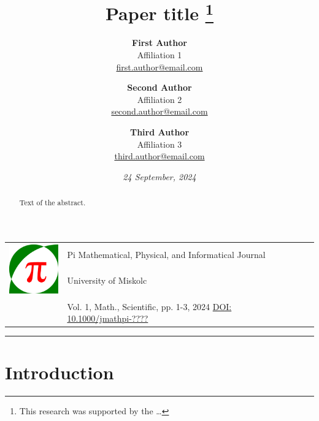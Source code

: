 \documentclass[a4paper,12pt]{article}
\begin{document}
\pagestyle{fancy}

\title{\sc Paper title \thanks{This research was supported by the \dots}}

\author{
	\textbf{First Author} \\
	Affiliation 1 \\
	\href{mailto:first.author@email.com}{first.author@email.com}
\and
	\textbf{Second Author} \\
	Affiliation 2 \\
	\href{mailto:second.author@email.com}{second.author@email.com}
\and
	\textbf{Third Author} \\
	Affiliation 3 \\
	\href{mailto:third.author@email.com}{third.author@email.com}
}

\date{\textit{24 September, 2024}}

\noindent \begin{tabular}{lp{13cm}}
	\multirow{3}{*}{\includegraphics[width=22mm, height=22mm]{jmathpi_logo.pdf}}
	& Pi Mathematical, Physical, and Informatical Journal \\
	& University of Miskolc \\
	& \\
	& Vol. 1, Math., Scientific, pp. 1-3, 2024 \hfill \href{https://doi.org/10.1000/jmathpi-1}{DOI: 10.1000/jmathpi-????} \\
\end{tabular}

\bigskip

\hrule

{\let\newpage\relax\maketitle}

\begin{abstract}
Text of the abstract.
\end{abstract}

{\def\thefootnote{}}

\section{Introduction}
\end{document}
